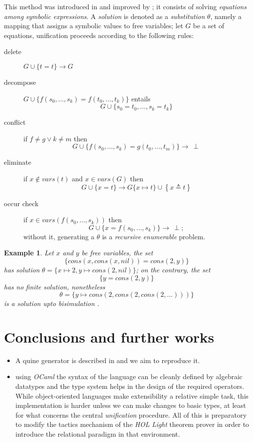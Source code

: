 \documentclass[a4paper,11pt]{article}
\newtheorem{example}[theorem]{Example}
\begin{document}
This method was introduced in \citep{robinson_unif} and
improved by \citep{Martelli:1982:EUA:357162.357169}; it consists of solving
\textit{equations among symbolic expressions}. A \textit{solution} is denoted
as a \textit{substitution} $\theta$, namely a mapping that assigns a symbolic
values to free variables; let $G$ be a set of equations, unification proceeds
according to the following rules:
\begin{description}
\item[delete] $G \cup \lbrace t = t \rbrace \rightarrow G$
\item[decompose] $G \cup \lbrace f(s_{0}, \ldots, s_{k}) = f(t_{0}, \ldots, t_{k})\rbrace$ entails
$$G \cup \lbrace s_{0}=t_{0},\ldots, s_{k}=t_{k} \rbrace$$
\item[conflict] if $f\neq g \vee k\neq m$ then $$G \cup \lbrace f(s_{0}, \ldots, s_{k}) = g(t_{0}, \ldots, t_{m})\rbrace \rightarrow \,\perp$$
\item[eliminate] if $x \not\in vars(t)$ and $x \in vars(G)$ then $$G \cup \lbrace x = t\rbrace \rightarrow G\lbrace x \mapsto t\rbrace \cup \left\lbrace x \triangleq t\right\rbrace $$
\item[occur check] if $x \in vars(f(s_{0},\ldots,s_{k}))$ then $$G \cup \lbrace x = f(s_{0}, \ldots, s_{k})\rbrace \rightarrow \,\perp;$$
without it, generating a $\theta$ is a
\emph{recursive enumerable} problem.
\end{description}

\begin{example}
Let $x$ and $y$ be free variables, the set
$$\lbrace cons(x,cons(x,nil)) = cons(2,y)\rbrace$$
has solution $\theta = \lbrace x \mapsto 2, y \mapsto cons(2,nil) \rbrace$;
on the contrary, the set
$$ \lbrace y = cons(2,y) \rbrace $$
has no \textit{finite} solution, nonetheless
$$\theta = \lbrace y \mapsto cons(2,cons(2,cons(2,...))) \rbrace$$
is a solution upto \textit{bisimulation}
\citep{10.1007/BFb0017309, DBLP:books/daglib/0067019}.
\end{example}
\section{Conclusions and further works}


\begin{itemize}
\item A quine generator is described in \citep{Byrd:2012:MLU:2661103.2661105}
and we aim to reproduce it.

\item using \emph{OCaml} the syntax of the language can be cleanly defined by
algebraic datatypes and the type system helps in the design of the required
operators.  While object-oriented languages make extensibility a relative
simple task, this implementation is harder unless we can make changes to basic
types, at least for what concerns the central \emph{unification} procedure.
All of this is preparatory to modify the tactics mechanism of the \emph{HOL
Light} theorem prover in order to introduce the relational paradigm in that
environment.
\end{itemize}



\end{document}

